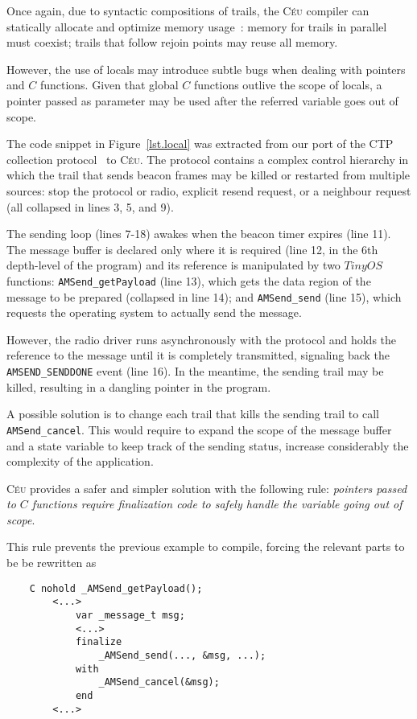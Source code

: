 \documentclass[10pt]{sensys-proc}
\newcommand{\CEU}{\textsc{C\'{e}u}\xspace}
\newcommand{\code}[1] {{\small{\texttt{#1}}}}
\begin{document}
Once again, due to syntactic compositions of trails, the \CEU compiler can 
statically allocate and optimize memory usage~\cite{wsn.osm}:
memory for trails in parallel must coexist;
trails that follow rejoin points may reuse all memory.

However, the use of locals may introduce subtle bugs when dealing with pointers 
and $C$ functions.
Given that global $C$ functions outlive the scope of locals, a pointer passed 
as parameter may be used after the referred variable goes out of scope.

The code snippet in Figure~\ref{lst.local} was extracted from our port of the 
CTP collection protocol~\cite{wsn.teps} to \CEU.
The protocol contains a complex control hierarchy in which the trail that sends 
beacon frames may be killed or restarted from multiple sources: stop the 
protocol or radio, explicit resend request, or a neighbour request (all 
collapsed in lines 3, 5, and 9).

The sending loop (lines 7-18) awakes when the beacon timer expires (line 11).
The message buffer is declared only where it is required (line 12, in the 6th 
depth-level of the program) and its reference is manipulated by two $TinyOS$ 
functions:
\code{AMSend\_getPayload} (line 13), which gets the data region of the message 
to be prepared (collapsed in line 14);
and \code{AMSend\_send} (line 15), which requests the operating system to 
actually send the message.

However, the radio driver runs asynchronously with the protocol and holds the 
reference to the message until it is completely transmitted, signaling back the 
\code{AMSEND\_SENDDONE} event (line 16).
In the meantime, the sending trail may be killed, resulting in a dangling 
pointer in the program.

A possible solution is to change each trail that kills the sending trail to 
call \code{AMSend\_cancel}.
This would require to expand the scope of the message buffer and a state 
variable to keep track of the sending status, increase considerably the 
complexity of the application.

\CEU provides a safer and simpler solution with the following rule:
\emph{pointers passed to $C$ functions require finalization code to safely 
handle the variable going out of scope}.

This rule prevents the previous example to compile, forcing the relevant parts 
to be be rewritten as

{\small
\begin{verbatim}
    C nohold _AMSend_getPayload();
        <...>
            var _message_t msg;
            <...>
            finalize
                _AMSend_send(..., &msg, ...);
            with
                _AMSend_cancel(&msg);
            end
        <...>
\end{verbatim}
}
\end{document}
